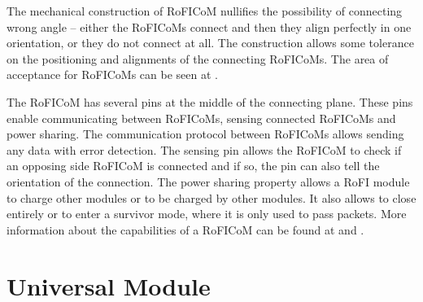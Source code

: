 \documentclass[
  digital, %
  table,   %
  oneside, %
  nolof,     %
  nolot,     %
]{fithesis3}
\begin{document}
The mechanical construction of RoFICoM nullifies the possibility of connecting wrong angle -- either the RoFICoMs connect and then they align perfectly in one orientation, or they do not connect at all.
The construction allows some tolerance on the positioning and alignments of the connecting RoFICoMs.
The area of acceptance for RoFICoMs can be seen at \cite[p. 6]{roficom}.

The RoFICoM has several pins at the middle of the connecting plane.
These pins enable communicating between RoFICoMs, sensing connected RoFICoMs and power sharing.
The communication protocol between RoFICoMs allows sending any data with error detection.
The sensing pin allows the RoFICoM to check if an opposing side RoFICoM is connected and if so, the pin can also tell the orientation of the connection.
The power sharing property allows a RoFI module to charge other modules or to be charged by other modules.
It also allows to close entirely or to enter a survivor mode, where it is only used to pass packets.
More information about the capabilities of a RoFICoM can be found at \cite{roficom} and \cite{rofi-web}.

\section{Universal Module}
\label{univ-module}
\end{document}
